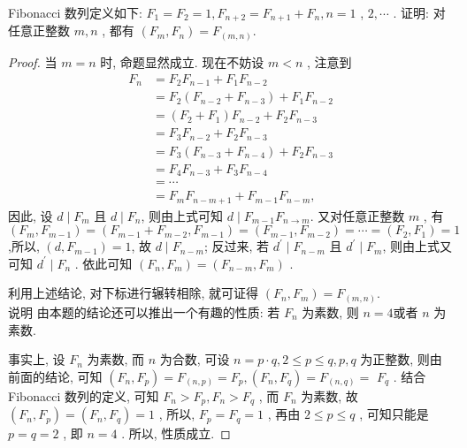 \begin{example}
	Fibonacci 数列定义如下:  $F_{1}=F_{2}=1, F_{n+2}=F_{n+1}+F_{n}, n=1$ ,  $2, \cdots$ . 证明: 对任意正整数 $m ,  n$ , 都有 $\left(F_{m}, F_{n}\right)=F_{(m, n)}$.
\end{example}
\begin{proof}
	当 $m=n$ 时, 命题显然成立. 现在不妨设 $m<n$ , 注意到
	\begin{align*}
		F_{n} & =F_{2} F_{n-1}+F_{1} F_{n-2}                     \\
		      & =F_{2}\left(F_{n-2}+F_{n-3}\right)+F_{1} F_{n-2} \\
		      & =\left(F_{2}+F_{1}\right) F_{n-2}+F_{2} F_{n-3}  \\
		      & =F_{3} F_{n-2}+F_{2} F_{n-3}                     \\
		      & =F_{3}\left(F_{n-3}+F_{n-4}\right)+F_{2} F_{n-3} \\
		      & =F_{4} F_{n-3}+F_{3} F_{n-4}                     \\
		      & =\cdots                                          \\
		      & =F_{m} F_{n-m+1}+F_{m-1} F_{n-m},
	\end{align*}
	因此, 设 $d \mid F_{m}$ 且 $d \mid F_{n}$, 则由上式可知 $d \mid F_{m-1} F_{n \rightarrow m}$. 又对任意正整数 $m$ , 有 $\left(F_{m}, F_{m-1}\right)=\left(F_{m-1}+F_{m-2}, F_{m-1}\right)=\left(F_{m-1}, F_{m-2}\right)=\cdots=\left(F_{2}, F_{1}\right)=1$,所以, $\left(d, F_{m-1}\right)=1$, 故 $d \mid F_{n-m}$; 反过来, 若 $d^{\prime} \mid F_{n-m}$ 且 $d^{\prime} \mid F_{m}$, 则由上式又可知 $d^{\prime} \mid F_{n}$ . 依此可知 $\left(F_{n}, F_{m}\right)=\left(F_{n-m}, F_{m}\right)$ .

	利用上述结论, 对下标进行辗转相除, 就可证得 $\left(F_{n}, F_{m}\right)=F_{(m, n)}$.\\
	说明 由本题的结论还可以推出一个有趣的性质: 若 $F_{n}$ 为素数, 则 $n=4$或者 $n$ 为素数.

	事实上, 设 $F_{n}$ 为素数, 而 $n$ 为合数, 可设 $n=p \cdot q, 2 \leqslant p \leqslant q, p ,  q$ 为正整数, 则由前面的结论, 可知 $\left(F_{n}, F_{p}\right)=F_{(n, p)}=F_{p},\left(F_{n}, F_{q}\right)=F_{(n, q)}=$ $F_{q}$ . 结合 Fibonacci 数列的定义, 可知 $F_{n}>F_{p}, F_{n}>F_{q}$ , 而 $F_{n}$ 为素数, 故 $\left(F_{n}, F_{p}\right)=\left(F_{n}, F_{q}\right)=1$ , 所以,  $F_{p}=F_{q}=1$ , 再由 $2 \leqslant p \leqslant q$ , 可知只能是 $p=q=2$ , 即 $n=4$ . 所以, 性质成立.
\end{proof}

